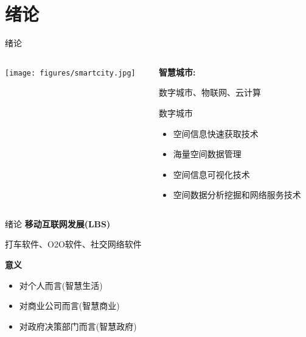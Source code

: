 \section{绪论}

\begin{frame}{绪论}
    \begin{columns}
        \begin{column}{0.5\textwidth}
        \texttt{[image: figures/smartcity.jpg]}
        \end{column}

        \begin{column}{0.5\textwidth}
        \textbf{智慧城市:} 
        
        数字城市、物联网、云计算
        \vspace{2em}

        \pause
        \alert{数字城市}
        \begin{itemize}
        \pause
        \item 空间信息快速获取技术
        \pause
        \item 海量空间数据管理
        \pause
        \item 空间信息可视化技术
        \pause
        \item 空间数据分析挖掘和网络服务技术
        \end{itemize}
        \end{column}
   \end{columns}
\end{frame}

\begin{frame}{绪论}
    \textbf{移动互联网发展(LBS)}

    打车软件、O2O软件、社交网络软件

    \vspace{2em}
    \pause
    \textbf{意义}
    \begin{itemize}
        \pause
        \item 对个人而言(智慧生活)
        \pause
        \item 对商业公司而言(智慧商业)
        \pause
        \item 对政府决策部门而言(智慧政府)
    \end{itemize}
\end{frame}

